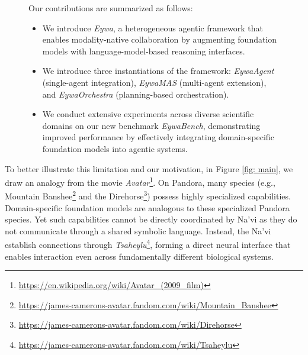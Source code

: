 \begin{figure}[t]
\vspace{-3mm}
\centering
\begin{tcolorbox}[agentstruct,title=\textbf{Contributions}]
Our contributions are summarized as follows:
\begin{itemize}
    \item We introduce \textit{Eywa}, a heterogeneous agentic framework that enables modality-native collaboration by augmenting foundation models with language-model-based reasoning interfaces.
    \item We introduce three instantiations of the framework: \textit{EywaAgent} (single-agent integration), \textit{EywaMAS} (multi-agent extension), and \textit{EywaOrchestra} (planning-based orchestration).
    \item We conduct extensive experiments across diverse scientific domains on our new benchmark \textit{EywaBench}, demonstrating improved performance by effectively integrating domain-specific foundation models into agentic systems.
\end{itemize}
\end{tcolorbox}
\vspace{-3mm}
\end{figure}

To better illustrate this limitation and our motivation, in Figure \ref{fig: main}, we draw an analogy from the movie \textit{Avatar}\footnote{\url{https://en.wikipedia.org/wiki/Avatar_(2009_film)}}. On Pandora, many species (e.g., Mountain Banshee\footnote{\url{https://james-camerons-avatar.fandom.com/wiki/Mountain_Banshee}} and the Direhorse\footnote{\url{https://james-camerons-avatar.fandom.com/wiki/Direhorse}}) possess highly specialized capabilities. Domain-specific foundation models are analogous to these specialized Pandora species. 
Yet such capabilities cannot be directly coordinated by Na'vi as they do not communicate through a shared symbolic language.
Instead, the Na'vi establish connections through \textit{Tsaheylu}\footnote{\url{https://james-camerons-avatar.fandom.com/wiki/Tsaheylu}}, forming a direct neural interface that enables interaction even across fundamentally different biological systems.

